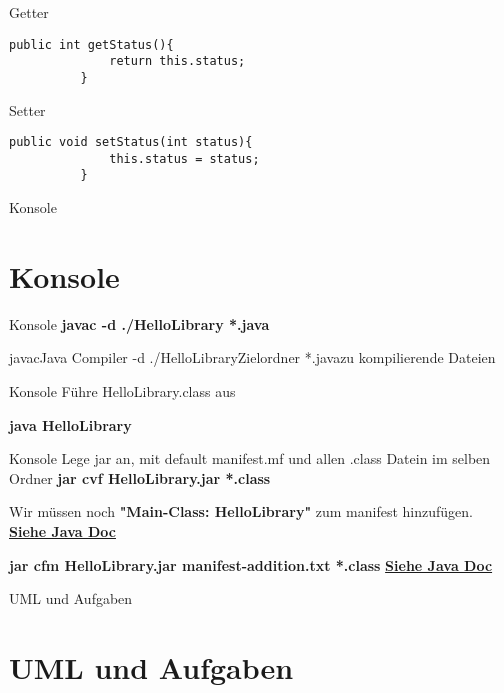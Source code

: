 \documentclass[10pt]{beamer}
\begin{document}
\begin{frame}[fragile]{Getter}
    \begin{lstlisting}[basicstyle=\ttfamily\scriptsize,gobble=8]
          public int getStatus(){
              return this.status;
          }
    \end{lstlisting}
\end{frame}

\begin{frame}[fragile]{Setter}
    \begin{lstlisting}[basicstyle=\ttfamily\scriptsize,gobble=8]
          public void setStatus(int status){  
              this.status = status;
          }
    \end{lstlisting}
\end{frame}

\begin{frame}[fragile]{Konsole}
    \section{Konsole}
\end{frame}

\begin{frame}[fragile]{Konsole}
     \textcolor{mygreen}{\textbf{javac -d ./HelloLibrary *.java}}\newline

     javac\qquad\qquad\qquad Java Compiler\newline
    -d ./HelloLibrary\qquad Zielordner\newline
    *.java\qquad\qquad\qquad\quad zu kompilierende Dateien\newline
\end{frame}

\begin{frame}[fragile]{Konsole}
    Führe HelloLibrary.class aus
    
   \textcolor{mygreen}{\textbf{java HelloLibrary}}
\end{frame}

\begin{frame}[fragile]{Konsole}
    Lege jar an, mit default manifest.mf und \newline
    allen .class Datein im selben Ordner\newline
    \textcolor{mygreen}{\textbf{ jar cvf HelloLibrary.jar *.class}}\newline

    Wir müssen noch\newline
    \textcolor{mygreen}{\textbf{"Main-Class: HelloLibrary"}}\newline
    zum manifest hinzufügen.\newline
    \textcolor{mymauve}{\textbf{\href{https://docs.oracle.com/javase/tutorial/deployment/jar/appman.html}{Siehe Java Doc}\\}}

    \textcolor{mygreen}{\textbf{jar cfm HelloLibrary.jar manifest-addition.txt *.class}}\newline
    \textcolor{mymauve}{\textbf{\href{https://docs.oracle.com/javase/tutorial/deployment/jar/modman.html}{Siehe Java Doc}\\}}
\end{frame}

\begin{frame}[fragile]{UML und Aufgaben}
    \section{UML und Aufgaben}
\end{frame}
\end{document}
